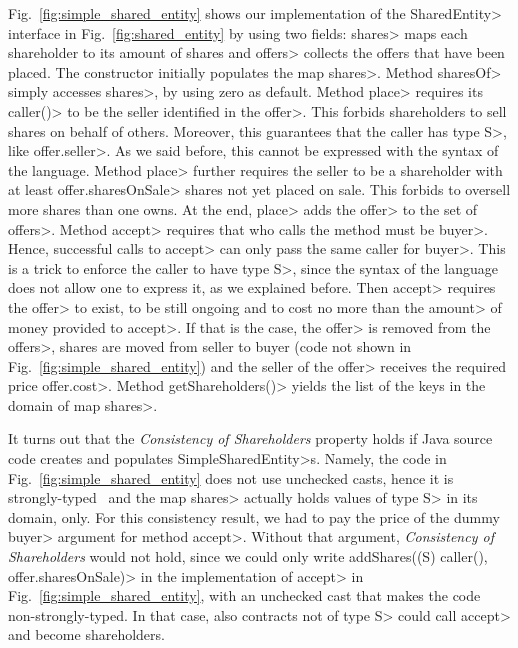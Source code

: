 Fig.~\ref{fig:simple_shared_entity} shows our implementation of the \<SharedEntity> interface
in Fig.~\ref{fig:shared_entity}
by using two fields: \<shares> maps each shareholder to its amount of shares and
\<offers> collects the offers that have been placed.
The constructor initially populates the map \<shares>.
Method \<sharesOf> simply accesses
\<shares>, by using zero as default. Method \<place> requires its \<caller()> to be
the seller identified in the \<offer>. This forbids shareholders to sell shares on behalf of others.
Moreover, this guarantees that the caller has type \<S>, like \<offer.seller>.
As we said before, this cannot be expressed with the syntax of the language.
Method \<place> further requires the seller to be a shareholder with at least \<offer.sharesOnSale>
shares not yet placed on sale. This forbids to oversell more shares
than one owns. At the end, \<place> adds the \<offer> to the set of \<offers>.
Method \<accept> requires that who calls the method must be \<buyer>. Hence, successful
calls to \<accept> can only pass the same caller for \<buyer>. This is a trick to enforce the
caller to have type \<S>, since the syntax of the language does not allow one to express it,
as we explained before. Then \<accept> requires the \<offer> to exist, to be still ongoing
and to cost no more than the \<amount> of money provided to \<accept>. If that is the case,
the \<offer> is removed from the \<offers>, shares are moved from seller to buyer (code not
shown in Fig.~\ref{fig:simple_shared_entity}) and the seller of the \<offer>
receives the required price \<offer.cost>.
Method \<getShareholders()> yields the list of the keys in the domain of map \<shares>.

It turns out that the \emph{Consistency of Shareholders} property holds if Java source code
creates and populates \<SimpleSharedEntity>s.
Namely, the code in Fig.~\ref{fig:simple_shared_entity}
does not use unchecked casts, hence it is strongly-typed~\cite{NaftalinW06} and
the map \<shares> actually holds values of type \<S> in its domain, only.
For this consistency result, we had to pay the price
of the dummy \<buyer> argument for method \<accept>. Without that argument,
\emph{Consistency of Shareholders} would not hold, since we could only write
\<addShares((S) caller(), offer.sharesOnSale)> in the implementation of \<accept> in
Fig.~\ref{fig:simple_shared_entity}, with an unchecked cast that makes the code
non-strongly-typed. In that case, also contracts not of type \<S> could call \<accept>
and become shareholders.

